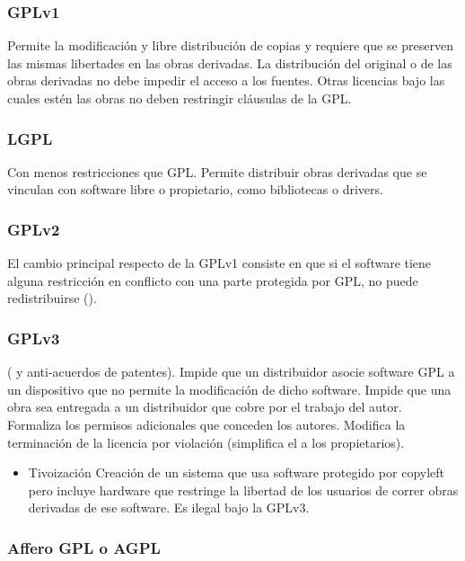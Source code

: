 \subsubsection {GPLv1}
Permite la modificación y libre distribución de copias y requiere que se preserven las mismas libertades en las obras derivadas. La distribución del original o de las obras derivadas no debe impedir el acceso a los fuentes. Otras licencias bajo las cuales estén las obras no deben restringir cláusulas de la GPL.

\subsubsection {LGPL}

Con menos restricciones que GPL. Permite distribuir obras derivadas que se vinculan con software libre o propietario, como bibliotecas o drivers. 

\subsubsection {GPLv2}

El cambio principal respecto de la GPLv1 consiste en que si el software tiene alguna restricción en conflicto con una parte protegida por GPL, no puede redistribuirse (). 

\subsubsection {GPLv3}
( y anti-acuerdos de patentes). Impide que un distribuidor asocie software GPL a un dispositivo que no permite la modificación de dicho software. Impide que una obra sea entregada a un distribuidor que cobre por el trabajo del autor. Formaliza los permisos adicionales que conceden los autores. Modifica la terminación de la licencia por violación (simplifica el  a los propietarios).

\begin{itemize}
	\item Tivoización
	\subitem Creación de un sistema que usa software protegido por copyleft pero incluye hardware que restringe la libertad de los usuarios de correr obras derivadas de ese software. Es ilegal bajo la 
GPLv3.

\end{itemize}

\subsubsection {Affero GPL o AGPL}

